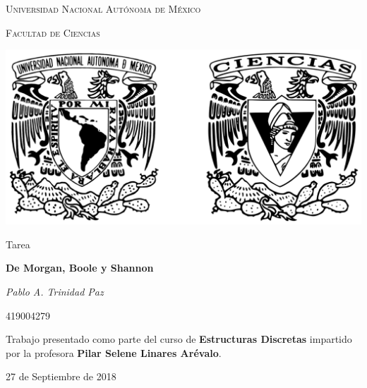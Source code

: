 \documentclass[11pt,letterpaper]{article}
\begin{document}
\begin{titlepage}
    \centering

    {\scshape\LARGE Universidad Nacional Autónoma de México \par}

    \vspace{1cm}
    {\scshape\Large Facultad de Ciencias\par}
    \vspace{1.5cm}

    \begin{center}
        \includegraphics[scale=.1]{../../../assets/img/logo.png}
    \end{center}

    \vspace{.8 cm}

    {\LARGE Tarea \par}
    {\huge\bfseries De Morgan, Boole y Shannon \par}

    \vspace{0.5cm}
    {\large\itshape Pablo A. Trinidad Paz\par}
    419004279

    \vfill

    Trabajo presentado como parte del curso de \textbf{Estructuras Discretas}
    impartido por la profesora \textbf{Pilar Selene Linares Arévalo}. \par
    \vspace{0.1cm}
    {\large 27 de Septiembre de 2018\par}
\end{titlepage}
\end{document}
